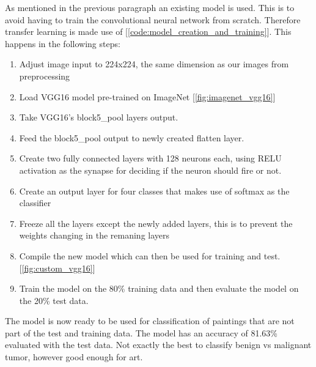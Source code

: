  As mentioned in the previous paragraph an existing model is used. This is to avoid having to train the convolutional neural network from scratch. Therefore transfer learning is made use of [\ref{code:model_creation_and_training}]. This happens in the following steps:
\begin{enumerate}
    \item Adjust image input to 224x224, the same dimension as our images from preprocessing
    \item Load VGG16 model pre-trained on ImageNet [\ref{fig:imagenet_vgg16}]
    \item Take VGG16's block5\_pool layers output.
    \item Feed the block5\_pool output to newly created flatten layer.
    \item Create two fully connected layers with 128 neurons each, using RELU activation as the synapse for deciding if the neuron should fire or not. 
    \item Create an output layer for four classes that makes use of softmax as the classifier
    \item Freeze all the layers except the newly added layers, this is to prevent the weights changing in the remaning layers
    \item Compile the new model which can then be used for training and test. [\ref{fig:custom_vgg16}]
    \item Train the model on the 80\% training data and then evaluate the model on the 20\% test data.
\end{enumerate}

The model is now ready to be used for classification of paintings that are not part of the test and training data. The model has an accuracy of 81.63\% evaluated with the test data. Not exactly the best to classify benign vs malignant tumor, however good enough for art.




